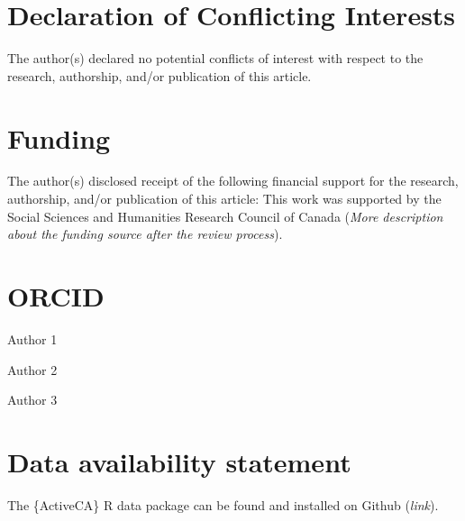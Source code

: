 \documentclass[Royal,times,sageh]{sagej}
\begin{document}
\hypertarget{declaration-of-conflicting-interests}{%
\section{Declaration of Conflicting
Interests}\label{declaration-of-conflicting-interests}}

The author(s) declared no potential conflicts of interest with respect
to the research, authorship, and/or publication of this article.

\hypertarget{funding}{%
\section{Funding}\label{funding}}

The author(s) disclosed receipt of the following financial support for
the research, authorship, and/or publication of this article: This work
was supported by the Social Sciences and Humanities Research Council of
Canada (\emph{More description about the funding source after the review
process}).

\hypertarget{orcid}{%
\section{ORCID}\label{orcid}}

Author 1

Author 2

Author 3

\hypertarget{data-availability-statement}{%
\section{Data availability
statement}\label{data-availability-statement}}

The \{ActiveCA\} R data package can be found and installed on Github
(\emph{link}).



\end{document}
